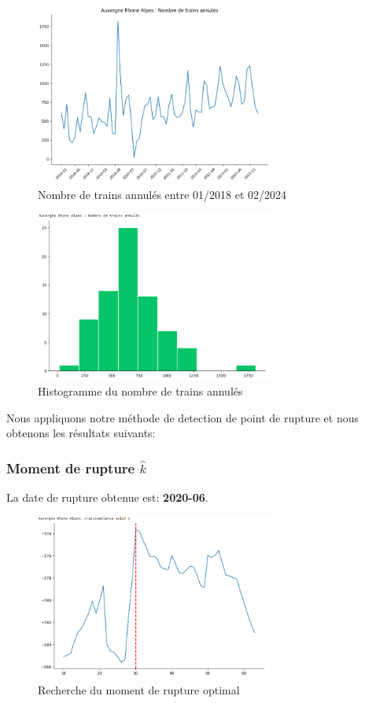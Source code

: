 {\begin{figure}[H]
  \centering
  \includegraphics[width=0.7\textwidth]{image/ARA_TA_1.png}
  \caption{Nombre de trains annulés entre 01/2018 et 02/2024}
\end{figure}

\begin{figure}[H]
  \centering
  \includegraphics[width=0.7\textwidth]{image/ARA_TA_2.png}
  \caption{Histogramme du nombre de trains annulés}
\end{figure}

Nous appliquons notre méthode de detection de point de rupture et nous obtenons les résultats suivants:

\subsubsection{Moment de rupture $\hat{k}$}

La date de rupture obtenue est: \textbf{2020-06}. 

\begin{figure}[H]
  \centering
  \includegraphics[width=0.7\textwidth]{image/ARA_TA_3_bis.png}
  \caption{Recherche du moment de rupture optimal}
\end{figure}

}
